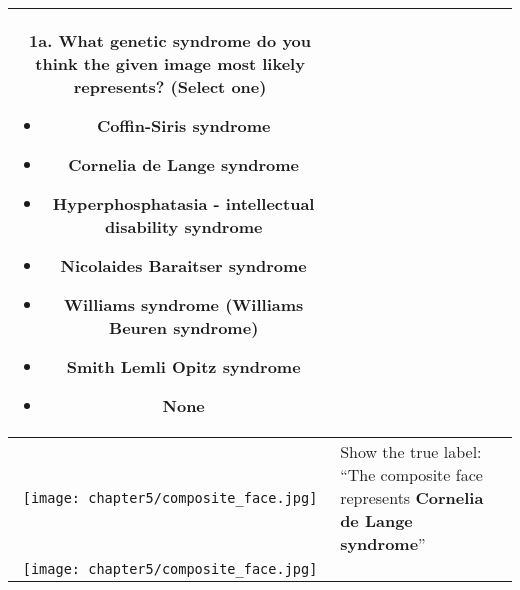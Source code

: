 \documentclass[../report.tex]{subfiles}
\begin{document}
\begin{table}[H]
\begin{tabular}{ | c | m{7cm} |}
    		1a. What genetic syndrome do you think the given image most likely represents? (Select one)
    		\begin{itemize}
    			\item Coffin-Siris syndrome
    			\item Cornelia de Lange syndrome
    			\item Hyperphosphatasia - intellectual disability syndrome
    			\item Nicolaides Baraitser syndrome
    			\item Williams syndrome (Williams Beuren syndrome)
    			\item Smith Lemli Opitz syndrome
    			\item None
    		\end{itemize}
    		\hspace{1cm}
    		\\ \hline
    	\centering
    	\begin{minipage}{.49\textwidth}
    		\vspace*{1cm}
    		\centering
    		\texttt{[image: chapter5/composite\_face.jpg]}
    		
    		\vspace*{1cm}
    	\end{minipage}
    	
    	&

    	
    	Show the true label: \enquote{The composite face represents \textbf{Cornelia de Lange syndrome}}
    	
    	
    	\\ \hline
    	\begin{minipage}{.49\textwidth}
    		\vspace*{1cm}
    		\centering
    		\texttt{[image: chapter5/composite\_face.jpg]}
    		\vspace*{1cm}
    	\end{minipage}
    	

\end{tabular}
\end{table}
\end{document}
